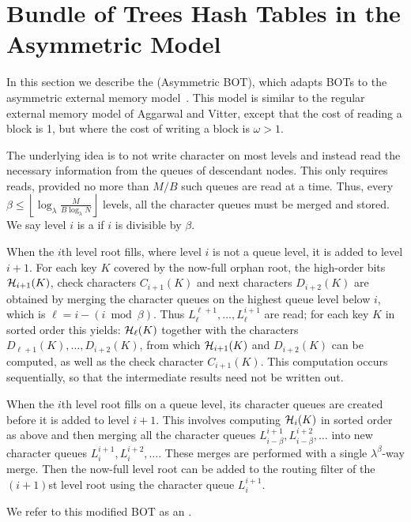 \section{Bundle of Trees Hash Tables in the Asymmetric Model}\label{sec:boa-asymmetric}

In this section we describe the  (Asymmetric BOT), which adapts BOTs to the asymmetric external memory
model~\cite{DBLP:conf/spaa/BlellochFGGS15}. This model is similar to the
regular external memory model of Aggarwal and Vitter, except that the cost of
reading a block is 1, but where the cost of writing a block is $\omega>1$.

The underlying idea is to not write character on most levels and instead read
the necessary information from the queues of descendant nodes. This only
requires reads, provided no more than $M/B$ such queues are read at a time.
Thus, every $\beta \leq \left\lfloor\log_\lambda\frac{M}{B\log_\lambda
N}\right\rfloor$ levels, all the character queues must be merged and stored. We
say level $i$ is a  if $i$ is divisible by $\beta$.

When the $i$th level root fills, where level $i$ is not a queue level, it is
added to level $i+1$. For each key $K$ covered by the now-full orphan root, the
high-order bits $\mathcal{H}_{i+1}(K)$, check characters $C_{i+1}(K)$ and next
characters $D_{i+2}(K)$ are obtained by merging the character queues on the
highest queue level below $i$, which is $\ell=i - \left(i\bmod\beta\right)$.
Thus $L_\ell^{\ell + 1},\ldots, L_\ell^{i + 1}$ are read;  for each key $K$ in
sorted order this yields: $\mathcal{H}_{\ell}(K)$ together with the characters
$D_{\ell + 1}(K),\ldots,D_{i+2}(K)$, from which $\mathcal{H}_{i+1}(K)$ and
$D_{i+2}(K)$ can be computed, as well as the check character $C_{i+1}(K)$. This
computation occurs sequentially, so that the intermediate results need not be
written out.

When the $i$th level root fills on a queue level, its character queues are
created before it is added to level $i+1$. This involves computing
$\mathcal{H}_{i}(K)$ in sorted order as above and then merging all the character
queues $L_{i-\beta}^{i+1},L_{i-\beta}^{i+2},\ldots$ into new character queues
$L_i^{i+1},L_i^{i+2},\ldots$. These merges are performed with a single
$\lambda^\beta$-way merge. Then the now-full level root can be added to the
routing filter of the $(i+1)$st level root using the character queue
$L_i^{i+1}$.

We refer to this modified BOT as an . 

